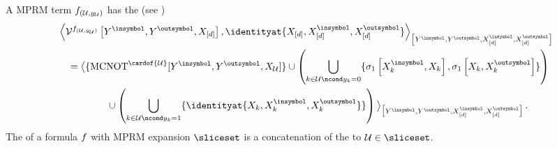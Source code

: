 \begin{lemma}
    A MPRM term $f_{(\mathcal{U},y_{\mathcal{U}})}$ has the \computationCircuit{} (see )
    \begin{align*}
        &\contractionof{\qcaencodingofat{\formulaof{\hardparam}}{\cheadvariable{\insymbol},\cheadvariable{\outsymbol},\shortcatvariables},
            \identityat{\shortcatvariables,\ccatvariableof{[\catorder]}{\insymbol},\ccatvariableof{[\catorder]}{\outsymbol}}}{
            \cheadvariable{\insymbol},\cheadvariable{\outsymbol},\ccatvariableof{[\catorder]}{\insymbol},\ccatvariableof{[\catorder]}{\outsymbol}
        } \\
        &\quad = \breakablecontractionof{
            \{\mathrm{MCNOT}^{\cardof{\hardlegset}}[\cheadvariable{\insymbol},\cheadvariable{\outsymbol},\catvariableof{\hardlegset}]\}
            \cup \left(\bigcup_{\catenumerator\in\hardlegset\ncond\headindexof{\catenumerator}=0}\{\paulixat{\ccatvariableof{\catenumerator}{\insymbol},\catvariableof{\catenumerator}},
                     \paulixat{\catvariableof{\catenumerator},\ccatvariableof{\catenumerator}{\outsymbol}}\}\right) \\
            &\quad\quad\quad\quad\quad \cup \left(\bigcup_{\catenumerator\in\hardlegset\ncond\headindexof{\catenumerator}=1}\{
                                                \identityat{\catvariableof{\catenumerator},\ccatvariableof{\catenumerator}{\insymbol},\ccatvariableof{\catenumerator}{\outsymbol}}
                                                \}\right)
        }{
            \cheadvariable{\insymbol},\cheadvariable{\outsymbol},\ccatvariableof{[\catorder]}{\insymbol},\ccatvariableof{[\catorder]}{\outsymbol}
        } \, .
    \end{align*}
    The \computationCircuit{} of a formula $f$ with MPRM expansion $\sliceset$ is a concatenation of the \computationCircuits{} to $\hardlegset\in\sliceset$.
\end{lemma}
